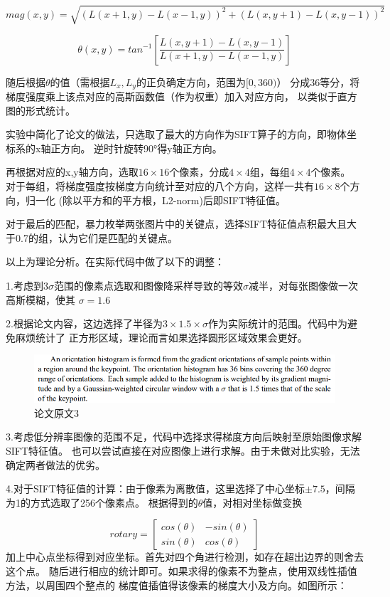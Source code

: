 \documentclass{article}
\begin{document}
\[
    mag(x, y) = \sqrt{\left(L(x + 1, y) - L(x - 1, y)\right)^2 + \left(L(x, y + 1) - L(x, y - 1)\right)^2}
\]

\[
    \theta(x, y) = tan^{-1}\left[\frac{L(x, y + 1) - L(x, y - 1)}{L(x + 1, y) - L(x - 1, y)}\right]
\]

    随后根据\(\theta\)的值（需根据\(L_x, L_y\)的正负确定方向，范围为\([0, 360)\)）
    分成36等分，将梯度强度乘上该点对应的高斯函数值（作为权重）加入对应方向，
    以类似于直方图的形式统计。

    实验中简化了论文的做法，只选取了最大的方向作为SIFT算子的方向，即物体坐标系的x轴正方向。
    逆时针旋转90°得y轴正方向。

    再根据对应的x,y轴方向，选取\(16 \times 16\)个像素，分成\(4 \times 4\)组，每组\(4 \times 4\)个像素。
    对于每组，将梯度强度按梯度方向统计至对应的八个方向，这样一共有\(16 \times 8\)个方向，归一化
    (除以平方和的平方根，L2-norm)后即SIFT特征值。

    对于最后的匹配，暴力枚举两张图片中的关键点，选择SIFT特征值点积最大且大于0.7的组，认为它们是匹配的关键点。

    以上为理论分析。在实际代码中做了以下的调整：

    1.考虑到\(3\sigma\)范围的像素点选取和图像降采样导致的等效\(\sigma\)减半，对每张图像做一次高斯模糊，使其
    \(\sigma = 1.6\)

    2.根据论文内容，这边选择了半径为\(3\times 1.5\times \sigma\)作为实际统计的范围。代码中为避免麻烦统计了
    正方形区域，理论而言如果选择圆形区域效果会更好。

\begin{figure}[h]
\centering
\includegraphics[width=1\textwidth]{./others/a3}
\caption{论文原文3}
\end{figure}

    3.考虑低分辨率图像的范围不足，代码中选择求得梯度方向后映射至原始图像求解SIFT特征值。
    也可以尝试直接在对应图像上进行求解。由于未做对比实验，无法确定两者做法的优劣。

    4.对于SIFT特征值的计算：由于像素为离散值，这里选择了中心坐标\(\pm7.5\)，间隔为1的方式选取了256个像素点。
    根据得到的\(\theta\)值，对相对坐标做变换

\[
    rotary = \begin{bmatrix}
                 cos(\theta) & -sin(\theta) \\
                 sin(\theta) & cos(\theta)
    \end{bmatrix}
\]
    加上中心点坐标得到对应坐标。首先对四个角进行检测，如存在超出边界的则舍去这个点。
    随后进行相应的统计即可。如果求得的像素不为整点，使用双线性插值方法，以周围四个整点的
    梯度值插值得该像素的梯度大小及方向。如图所示：
\end{document}
